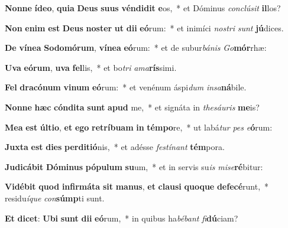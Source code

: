 \item \textbf{Non}\textbf{ne} \textbf{íd}\textbf{e}\textbf{o}, \textbf{qui}\textbf{a} \textbf{De}\textbf{us} \textbf{su}\textbf{us} \textbf{vén}\textbf{di}\textbf{dit} \textbf{e}os,~* et Dóminus \textit{con}\textit{clú}\textit{sit} \textbf{il}los?
\item \textbf{Non} \textbf{e}\textbf{nim} \textbf{est} \textbf{De}\textbf{us} \textbf{nos}\textbf{ter} \textbf{ut} \textbf{di}\textbf{i} \textbf{e}\textbf{ó}rum:~* et inimíci \textit{nos}\textit{tri} \textit{sunt} \textbf{jú}dices.
\item \textbf{De} \textbf{ví}\textbf{ne}\textbf{a} \textbf{So}\textbf{do}\textbf{mó}\textbf{rum}, \textbf{ví}\textbf{ne}\textbf{a} \textbf{e}\textbf{ó}rum:~* et de subur\textit{bá}\textit{nis} \textit{Go}\textbf{mór}rhæ:
\item \textbf{U}\textbf{va} \textbf{e}\textbf{ó}\textbf{rum}, \textbf{u}\textbf{va} \textbf{fel}lis,~* et bo\textit{tri} \textit{a}\textit{ma}\textbf{rís}simi.
\item \textbf{Fel} \textbf{dra}\textbf{có}\textbf{num} \textbf{vi}\textbf{num} \textbf{e}\textbf{ó}rum:~* et venénum áspi\textit{dum} \textit{in}\textit{sa}\textbf{ná}bile.
\item \textbf{Non}\textbf{ne} \textbf{hæc} \textbf{cón}\textbf{di}\textbf{ta} \textbf{sunt} \textbf{a}\textbf{pud} me,~* et signáta in \textit{the}\textit{sáu}\textit{ris} \textbf{me}is?
\item \textbf{Me}\textbf{a} \textbf{est} \textbf{úl}\textbf{ti}\textbf{o}, \textbf{et} \textbf{e}\textbf{go} \textbf{re}\textbf{trí}\textbf{bu}\textbf{am} \textbf{in} \textbf{tém}\textbf{po}re,~* ut labá\textit{tur} \textit{pes} \textit{e}\textbf{ó}rum:
\item \textbf{Jux}\textbf{ta} \textbf{est} \textbf{di}\textbf{es} \textbf{per}\textbf{di}\textbf{ti}\textbf{ó}nis,~* et adésse \textit{fes}\textit{tí}\textit{nant} \textbf{tém}pora.
\item \textbf{Ju}\textbf{di}\textbf{cá}\textbf{bit} \textbf{Dó}\textbf{mi}\textbf{nus} \textbf{pó}\textbf{pu}\textbf{lum} \textbf{su}um,~* et in servis su\textit{is} \textit{mi}\textit{se}\textbf{ré}bitur:
\item \textbf{Vi}\textbf{dé}\textbf{bit} \textbf{quod} \textbf{in}\textbf{fir}\textbf{má}\textbf{ta} \textbf{sit} \textbf{ma}\textbf{nus}, \textbf{et} \textbf{clau}\textbf{si} \textbf{quo}\textbf{que} \textbf{de}\textbf{fe}\textbf{cé}runt,~* residu\textit{í}\textit{que} \textit{con}\textbf{súmp}ti sunt.
\item \textbf{Et} \textbf{di}\textbf{cet}: \textbf{U}\textbf{bi} \textbf{sunt} \textbf{di}\textbf{i} \textbf{e}\textbf{ó}rum,~* in quibus ha\textit{bé}\textit{bant} \textit{fi}\textbf{dú}ciam?
